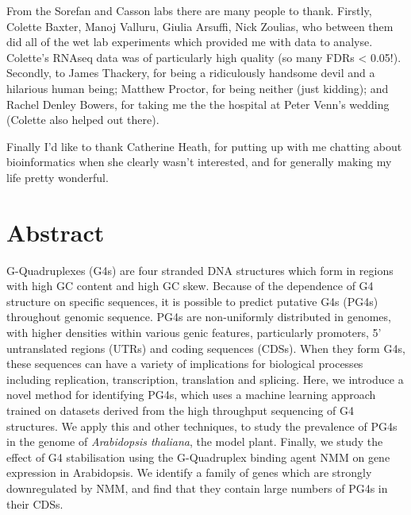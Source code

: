 \documentclass[12pt,a4paper,]{report}
\begin{document}
From the Sorefan and Casson labs there are many people to thank.
Firstly, Colette Baxter, Manoj Valluru, Giulia Arsuffi, Nick Zoulias,
who between them did all of the wet lab experiments which provided me
with data to analyse. Colette's RNAseq data was of particularly high
quality (so many FDRs \textless{} 0.05!). Secondly, to James Thackery,
for being a ridiculously handsome devil and a hilarious human being;
Matthew Proctor, for being neither (just kidding); and Rachel Denley
Bowers, for taking me the the hospital at Peter Venn's wedding (Colette
also helped out there).

Finally I'd like to thank Catherine Heath, for putting up with me
chatting about bioinformatics when she clearly wasn't interested, and
for generally making my life pretty wonderful.

\newpage
\section*{Abstract} 

G-Quadruplexes (G4s) are four stranded DNA structures which form in
regions with high GC content and high GC skew. Because of the dependence
of G4 structure on specific sequences, it is possible to predict
putative G4s (PG4s) throughout genomic sequence. PG4s are non-uniformly
distributed in genomes, with higher densities within various genic
features, particularly promoters, 5' untranslated regions (UTRs) and
coding sequences (CDSs). When they form G4s, these sequences can have a
variety of implications for biological processes including replication,
transcription, translation and splicing. Here, we introduce a novel
method for identifying PG4s, which uses a machine learning approach
trained on datasets derived from the high throughput sequencing of G4
structures. We apply this and other techniques, to study the prevalence
of PG4s in the genome of \emph{Arabidopsis thaliana}, the model plant.
Finally, we study the effect of G4 stabilisation using the G-Quadruplex
binding agent NMM on gene expression in Arabidopsis. We identify a
family of genes which are strongly downregulated by NMM, and find that
they contain large numbers of PG4s in their CDSs.

\newpage
\end{document}
